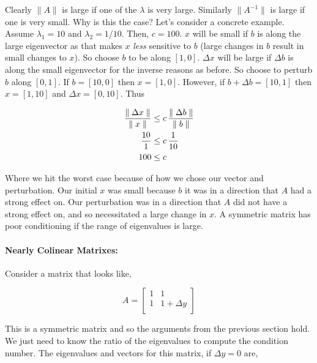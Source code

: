 \documentclass{article}
\newcommand{\norm}[1]{\mbox{\ensuremath{\parallel #1 \parallel}}}
\newcommand{\takeaway}[1]{{\color{red} #1}}
\begin{document}
\noindent
Clearly \norm{A} is large if one of the $\lambda$ is very large. Similarly \norm{A^{-1}} is large if one is very small.
Why is this the case? Let's consider a concrete example. Assume $\lambda_1 = 10$ and $\lambda_2 = 1/10$. Then, $c = 100$.
$x$ will be small if $b$ is along the large eigenvector as that makes $x$ {\em less\/} sensitive to $b$ (large changes in $b$ result in small changes to $x$). So choose $b$ to be along $[1, 0]$.
$\Delta x$ will be large if $\Delta b$ is along the small eigenvector for the inverse reasons as before. So choose to perturb $b$ along $[0, 1]$.
If $b = [10, 0]$ then $x = [1, 0]$. However, if $b + \Delta b = [10, 1]$ then $x = [1, 10]$ and $\Delta x = [0, 10]$.
Thus

\begin{align}
    \frac{\norm{\Delta x}}{\norm{x}} & \leq c \, \frac{\norm{\Delta b}}{\norm{b}} \\
    \frac{10}{1}                     & \leq c \, \frac{1}{10}                     \\
    100                              & \leq c
\end{align}

\noindent
Where we hit the worst case because of how we chose our vector and perturbation. Our initial $x$ was small because $b$ it was in a direction that $A$ had a strong effect on. Our perturbation was in a direction that $A$ did not have a strong effect on, and so necessitated a large change in $x$.
\takeaway{A symmetric matrix has poor conditioning if the range of eigenvalues is large.}

\paragraph{Nearly Colinear Matrixes:}

Consider a matrix that looks like,

\begin{equation}
    A = \begin{bmatrix}
        1 & 1            \\
        1 & 1 + \Delta y \\
    \end{bmatrix}
\end{equation}

This is a symmetric matrix and so the arguments from the previous section hold. We just need to know the ratio of the eigenvalues to compute the condition number. The eigenvalues and vectors for this matrix, if $\Delta y = 0$ are,
\end{document}
